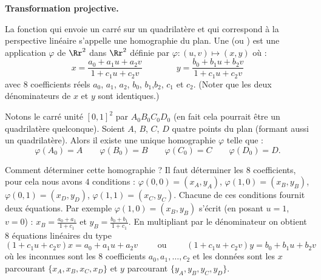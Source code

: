 \documentclass[11pt,class=report,crop=false]{standalone}
\begin{document}


\medskip
\textbf{Transformation projective.}

La fonction qui envoie un carré sur un quadrilatère et qui correspond à la perspective linéaire 
s'appelle une homographie du plan.
Une  (ou ) est une application
$\varphi$ de $\Rr^2$ dans $\Rr^2$ définie par $\varphi : (u,v) \mapsto (x,y)$ où :
$$x = \frac{a_0+a_1u+a_2v}{1+c_1u+c_2v}
\qquad\qquad
y = \frac{b_0+b_1u+b_2v}{1+c_1u+c_2v}$$
avec $8$ coefficients réels $a_0$, $a_1$, $a_2$, $b_0$, $b_1$,$b_2$, $c_1$ et $c_2$. (Noter que les deux dénominateurs de $x$ et $y$ sont identiques.)

Notons le carré unité $[0,1]^2$ par $A_0B_0C_0D_0$ (en fait cela pourrait être un quadrilatère quelconque). Soient $A$, $B$, $C$, $D$ quatre points du plan (formant aussi un quadrilatère). Alors il existe une unique homographie $\varphi$ telle que :
$$\varphi(A_0) = A \qquad \varphi(B_0) = B \qquad \varphi(C_0) = C \qquad \varphi(D_0) = D.$$

Comment déterminer cette homographie ? Il faut déterminer les $8$ coefficients, pour cela nous avons $4$ conditions :
$\varphi(0,0) = (x_A,y_A)$, 
$\varphi(1,0) = (x_B,y_B)$,
$\varphi(0,1) = (x_D,y_D)$,
$\varphi(1,1) = (x_C,y_C)$.
Chacune de ces conditions  fournit deux équations. Par exemple $\varphi(1,0) = (x_B,y_B)$ s'écrit (en posant $u=1$, $v=0$) : $x_B = \frac{a_0+a_1}{1+c_1}$ et $y_B = \frac{b_0+b_1}{1+c_1}$.
En multipliant par le dénominateur on obtient $8$ équations linéaires du type
$$(1+c_1u+c_2v)x = a_0+a_1u+a_2v
\qquad\text{ ou }\qquad
(1+c_1u+c_2v)y = b_0+b_1u+b_2v$$
où les inconnues sont les $8$ coefficients $a_0,a_1,\ldots,c_2$ et les données sont les $x$ parcourant $\{x_A, x_B, x_C, x_D\}$ et $y$  parcourant $\{y_A, y_B, y_C, y_D\}$.
\end{document}
